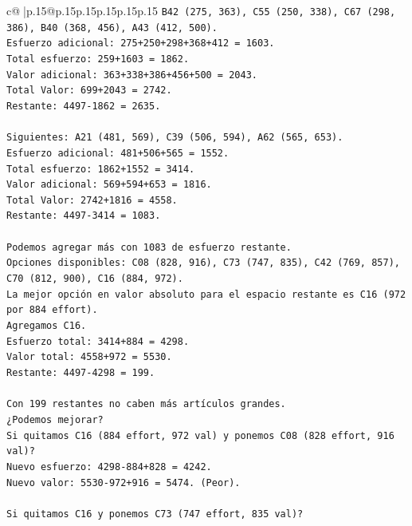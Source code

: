 \documentclass{article}
\begin{document}
{\begin{supertabular}{c@{$\;$}|p{.15\linewidth}@{}p{.15\linewidth}p{.15\linewidth}p{.15\linewidth}p{.15\linewidth}p{.15\linewidth}}
{{{\texttt{B42 (275, 363), C55 (250, 338), C67 (298, 386), B40 (368, 456), A43 (412, 500).} \\
\texttt{Esfuerzo adicional: 275+250+298+368+412 = 1603.} \\
\texttt{Total esfuerzo: 259+1603 = 1862.} \\
\texttt{Valor adicional: 363+338+386+456+500 = 2043.} \\
\texttt{Total Valor: 699+2043 = 2742.} \\
\texttt{Restante: 4497{-}1862 = 2635.} \\
\\ 
\texttt{Siguientes: A21 (481, 569), C39 (506, 594), A62 (565, 653).} \\
\texttt{Esfuerzo adicional: 481+506+565 = 1552.} \\
\texttt{Total esfuerzo: 1862+1552 = 3414.} \\
\texttt{Valor adicional: 569+594+653 = 1816.} \\
\texttt{Total Valor: 2742+1816 = 4558.} \\
\texttt{Restante: 4497{-}3414 = 1083.} \\
\\ 
\texttt{Podemos agregar más con 1083 de esfuerzo restante.} \\
\texttt{Opciones disponibles: C08 (828, 916), C73 (747, 835), C42 (769, 857), C70 (812, 900), C16 (884, 972).} \\
\texttt{La mejor opción en valor absoluto para el espacio restante es C16 (972 por 884 effort).} \\
\texttt{Agregamos C16.} \\
\texttt{Esfuerzo total: 3414+884 = 4298.} \\
\texttt{Valor total: 4558+972 = 5530.} \\
\texttt{Restante: 4497{-}4298 = 199.} \\
\\ 
\texttt{Con 199 restantes no caben más artículos grandes.} \\
\texttt{¿Podemos mejorar?} \\
\texttt{Si quitamos C16 (884 effort, 972 val) y ponemos C08 (828 effort, 916 val)?} \\
\texttt{Nuevo esfuerzo: 4298{-}884+828 = 4242.} \\
\texttt{Nuevo valor: 5530{-}972+916 = 5474. (Peor).} \\
\\ 
\texttt{Si quitamos C16 y ponemos C73 (747 effort, 835 val)?} \\
}}}
\end{supertabular}}
\end{document}
